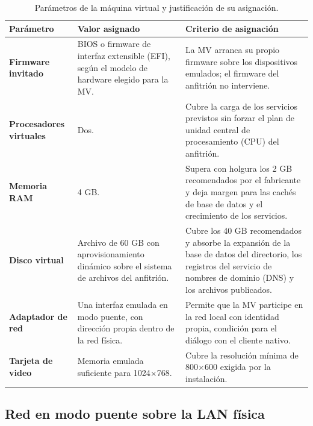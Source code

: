 \documentclass[12pt]{article}
\begin{document}
\begin{table}[htbp]
\centering
\small
\renewcommand{\arraystretch}{1.15}
\renewcommand{\tabularxcolumn}[1]{m{#1}}
\setlength{\emergencystretch}{1.5em}
\caption{Parámetros de la máquina virtual y justificación de su asignación.}
\label{tab:parametrosMaquinaVirtual}
\begin{tabularx}{\textwidth}{>{\centering\arraybackslash}m{3.6cm} X X}
\toprule
\textbf{Parámetro} & \textbf{Valor asignado} & \textbf{Criterio de asignación} \\
\midrule
\textbf{Firmware invitado} & BIOS o firmware de interfaz extensible (EFI), según el modelo de hardware elegido para la MV. & La MV arranca su propio firmware sobre los dispositivos emulados; el firmware del anfitrión no interviene. \\
\addlinespace
\textbf{Procesadores virtuales} & Dos. & Cubre la carga de los servicios previstos sin forzar el plan de unidad central de procesamiento (CPU) del anfitrión. \\
\addlinespace
\textbf{Memoria RAM} & 4 GB. & Supera con holgura los 2 GB recomendados por el fabricante y deja margen para las cachés de base de datos y el crecimiento de los servicios. \\
\addlinespace
\textbf{Disco virtual} & Archivo de 60 GB con aprovisionamiento dinámico sobre el sistema de archivos del anfitrión. & Cubre los 40 GB recomendados y absorbe la expansión de la base de datos del directorio, los registros del servicio de nombres de dominio (DNS) y los archivos publicados. \\
\addlinespace
\textbf{Adaptador de red} & Una interfaz emulada en modo puente, con dirección propia dentro de la red física. & Permite que la MV participe en la red local con identidad propia, condición para el diálogo con el cliente nativo. \\
\addlinespace
\textbf{Tarjeta de video} & Memoria emulada suficiente para 1024$\times$768. & Cubre la resolución mínima de 800$\times$600 exigida por la instalación. \\
\bottomrule
\end{tabularx}
\end{table}

\subsection{Red en modo puente sobre la LAN física}
\label{sec:puenteRed}
\end{document}
